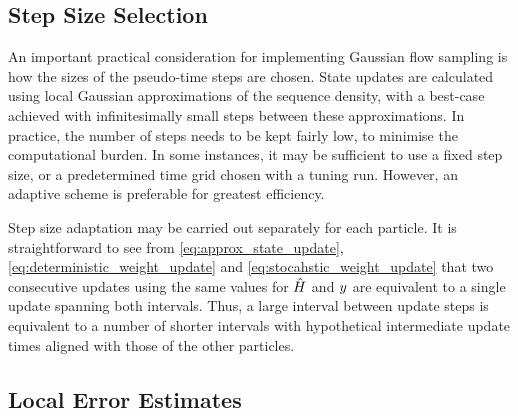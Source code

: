 \documentclass{article}
\begin{document}
\subsection{Step Size Selection}

An important practical consideration for implementing Gaussian flow sampling is how the sizes of the pseudo-time steps are chosen. State updates are calculated using local Gaussian approximations of the sequence density, with a best-case achieved with infinitesimally small steps between these approximations. In practice, the number of steps needs to be kept fairly low, to minimise the computational burden. In some instances, it may be sufficient to use a fixed step size, or a predetermined time grid chosen with a tuning run. However, an adaptive scheme is preferable for greatest efficiency.

Step size adaptation may be carried out separately for each particle. It is straightforward to see from \eqref{eq:approx_state_update}, \eqref{eq:deterministic_weight_update} and \eqref{eq:stocahstic_weight_update} that two consecutive updates using the same values for $\hat{H}_{}$ and $y_{}$ are equivalent to a single update spanning both intervals. Thus, a large interval between update steps is equivalent to a number of shorter intervals with hypothetical intermediate update times aligned with those of the other particles.


\subsection{Local Error Estimates}
\end{document}
